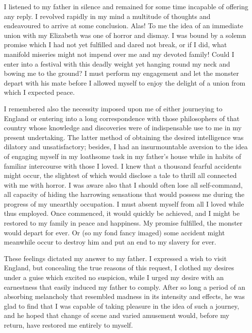 \documentclass[12pt,openright]{book}
\begin{document}
I listened to my father in silence and remained for some time incapable of offering any reply. I revolved rapidly in my mind a multitude of thoughts and endeavoured to arrive at some conclusion. Alas! To me the idea of an immediate union with my Elizabeth was one of horror and dismay. I was bound by a solemn promise which I had not yet fulfilled and dared not break, or if I did, what manifold miseries might not impend over me and my devoted family! Could I enter into a festival with this deadly weight yet hanging round my neck and bowing me to the ground? I must perform my engagement and let the monster depart with his mate before I allowed myself to enjoy the delight of a union from which I expected peace.

I remembered also the necessity imposed upon me of either journeying to England or entering into a long correspondence with those philosophers of that country whose knowledge and discoveries were of indispensable use to me in my present undertaking. The latter method of obtaining the desired intelligence was dilatory and unsatisfactory; besides, I had an insurmountable aversion to the idea of engaging myself in my loathsome task in my father’s house while in habits of familiar intercourse with those I loved. I knew that a thousand fearful accidents might occur, the slightest of which would disclose a tale to thrill all connected with me with horror. I was aware also that I should often lose all self-command, all capacity of hiding the harrowing sensations that would possess me during the progress of my unearthly occupation. I must absent myself from all I loved while thus employed. Once commenced, it would quickly be achieved, and I might be restored to my family in peace and happiness. My promise fulfilled, the monster would depart for ever. Or (so my fond fancy imaged) some accident might meanwhile occur to destroy him and put an end to my slavery for ever.

These feelings dictated my answer to my father. I expressed a wish to visit England, but concealing the true reasons of this request, I clothed my desires under a guise which excited no suspicion, while I urged my desire with an earnestness that easily induced my father to comply. After so long a period of an absorbing melancholy that resembled madness in its intensity and effects, he was glad to find that I was capable of taking pleasure in the idea of such a journey, and he hoped that change of scene and varied amusement would, before my return, have restored me entirely to myself.
\end{document}
